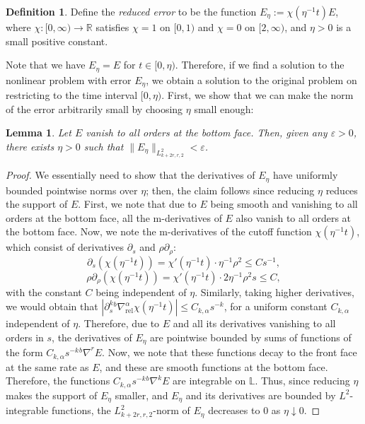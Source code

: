 \documentclass[10pt, a4paper]{article}
\theoremstyle{plain}%
\newtheorem{lem}[theorem]{Lemma}
\theoremstyle{definition}
\newtheorem{defn}[theorem]{Definition}
\numberwithin{figure}{section}
\numberwithin{equation}{section}
\newcommand{\bL}{\mathbb{L}}
\newcommand{\bR}{\mathbb{R}}
\newcommand{\pa}{\partial}
\newcommand{\rt}{\rightarrow}
\newcommand{\ep}{\varepsilon}
\newcommand{\rel}{\mathrm{rel}}
\begin{document}
\begin{defn}
	Define the \textit{reduced error} to be the function $E_\eta :=\chi(\eta^{-1} t)E$, where $\chi : [0,\infty)\rt\bR$ satisfies $\chi=1$ on $[0,1)$ and $\chi=0$ on $[2,\infty)$, and $\eta>0$ is a small positive constant.
\end{defn}
Note that we have $E_\eta =E$ for $t\in[0,\eta)$. Therefore, if we find a solution to the nonlinear problem with error $E_\eta$, we obtain a solution to the original problem on restricting to the time interval $[0,\eta)$. First, we show that we can make the norm of the error arbitrarily small by choosing $\eta$ small enough:
\begin{lem}
	Let $E$ vanish to all orders at the bottom face. Then, given any $\ep>0$, there exists $\eta>0$ such that $\|E_{\eta}\|_{L^2_{k+2r,r,2}} < \ep$.
\end{lem}
\begin{proof}
	We essentially need to show that the derivatives of $E_\eta$ have uniformly bounded pointwise norms over $\eta$; then, the claim follows since reducing $\eta$ reduces the support of $E$. First, we note that due to $E$ being smooth and vanishing to all orders at the bottom face, all the m-derivatives of $E$ also vanish to all orders at the bottom face. Now, we note the m-derivatives of the cutoff function $\chi(\eta^{-1}t)$, which consist of derivatives $\pa_s$ and $\rho\pa_\rho$:\[
	\pa_s(\chi(\eta^{-1}t))= \chi'(\eta^{-1}t)\cdot \eta^{-1}\rho^2\leq Cs^{-1},
	\]
	\[
	\rho\pa_\rho(\chi(\eta^{-1}t)) = \chi'(\eta^{-1}t) \cdot 2\eta^{-1}\rho^2s \leq C,
	\]
	with the constant $C$ being independent of $\eta$.	Similarly, taking higher derivatives, we would obtain that $|\pa_s^k{^b\nabla^\alpha_\rel\chi(\eta^{-1}t)}| \leq C_{k,\alpha} s^{-k}$, for a uniform constant $C_{k,\alpha}$ independent of $\eta$. Therefore, due to $E$ and all its derivatives vanishing to all orders in $s$, the derivatives of $E_\eta$ are pointwise bounded by sums of functions of the form $C_{k,\alpha}s^{-k}{^b\nabla}^rE$. Now, we note that these functions decay to the front face at the same rate as $E$, and these are smooth functions at the bottom face. Therefore, the functions $C_{k,\alpha}s^{-k}{^b\nabla^k}E$ are integrable on $\bL$. Thus, since reducing $\eta$ makes the support of $E_\eta$ smaller, and $E_\eta$ and its derivatives are bounded by $L^2$-integrable functions, the $L^2_{k+2r,r,2}$-norm of $E_\eta$ decreases to $0$ as $\eta\downarrow 0$.
\end{proof}
\end{document}

